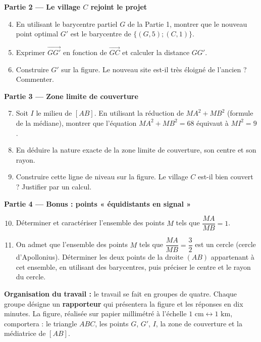 \documentclass[11pt]{article}
\begin{document}
\textbf{Partie 2 — Le village $C$ rejoint le projet}

\begin{enumerate}
\setcounter{enumi}{3}
\item En utilisant le barycentre partiel $G$ de la Partie 1, montrer que le nouveau point optimal $G'$ est le barycentre de $\{(G, 5) ; (C, 1)\}$.
\item Exprimer $\overrightarrow{GG'}$ en fonction de $\overrightarrow{GC}$ et calculer la distance $GG'$.
\item Construire $G'$ sur la figure. Le nouveau site est-il très éloigné de l'ancien ? Commenter.
\end{enumerate}

\textbf{Partie 3 — Zone limite de couverture}

\begin{enumerate}
\setcounter{enumi}{6}
\item Soit $I$ le milieu de $[AB]$. En utilisant la réduction de $MA^2 + MB^2$ (formule de la médiane), montrer que l'équation $MA^2 + MB^2 = 68$ équivaut à $MI^2 = 9$.
\item En déduire la nature exacte de la zone limite de couverture, son centre et son rayon.
\item Construire cette ligne de niveau sur la figure. Le village $C$ est-il bien couvert ? Justifier par un calcul.
\end{enumerate}

\textbf{Partie 4 — Bonus : points « équidistants en signal »}

\begin{enumerate}
\setcounter{enumi}{9}
\item Déterminer et caractériser l'ensemble des points $M$ tels que $\dfrac{MA}{MB} = 1$.
\item On admet que l'ensemble des points $M$ tels que $\dfrac{MA}{MB} = \dfrac{3}{2}$ est un cercle (cercle d'Apollonius). Déterminer les deux points de la droite $(AB)$ appartenant à cet ensemble, en utilisant des barycentres, puis préciser le centre et le rayon du cercle.
\end{enumerate}

\textbf{Organisation du travail :} le travail se fait en groupes de quatre. Chaque groupe désigne un \textbf{rapporteur} qui présentera la figure et les réponses en dix minutes. La figure, réalisée sur papier millimétré à l'échelle $1 \text{ cm} \leftrightarrow 1 \text{ km}$, comportera : le triangle $ABC$, les points $G$, $G'$, $I$, la zone de couverture et la médiatrice de $[AB]$.
\end{document}
